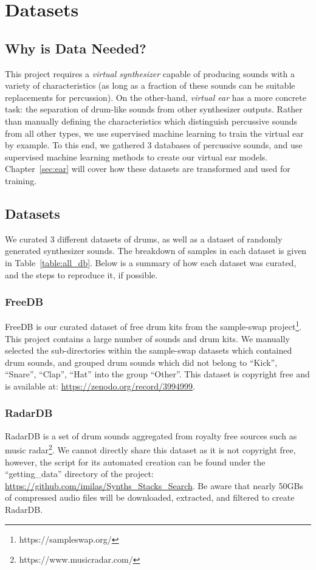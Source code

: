 \documentclass[\main/thesis.tex]{subfiles}
\begin{document}
\chapter{Datasets}
\label{sec:datasets}
\section{Why is Data Needed?}
This project requires a \textit{virtual synthesizer} capable of producing sounds with a variety of characteristics (as long as a fraction of these sounds can be suitable replacements for percussion). On the other-hand, \textit{virtual ear} has a more concrete task: the separation of drum-like sounds from other synthesizer outputs. Rather than manually defining the characteristics which distinguish percussive sounds from all other types, we use supervised machine learning to train the virtual ear by example. To this end, we gathered 3 databases of percussive sounds, and use supervised machine learning methods to create our virtual ear models. Chapter~\ref{sec:ear} will cover how these datasets are transformed and used for training.


\section{Datasets}
We curated 3 different datasets of drums, as well as a dataset of randomly generated synthesizer sounds.  The breakdown of samples in each dataset is given in Table~\ref{table:all_db}. Below is a summary of how each dataset was curated, and the steps to reproduce it, if possible. 
\subsection{FreeDB}
FreeDB is our curated dataset of free drum kits from the sample-swap project\footnote{https://sampleswap.org/}. This project contains  a large number of sounds and drum kits. We manually selected the sub-directories within the sample-swap datasets which contained drum sounds, and grouped drum sounds which did not belong to \enquote{Kick}, \enquote{Snare}, \enquote{Clap}, \enquote{Hat} into the group \enquote{Other}. This dataset is copyright free and is available at: \url{https://zenodo.org/record/3994999}. 
\subsection{RadarDB}
RadarDB is a set of drum sounds aggregated from royalty free sources such as music radar\footnote{https://www.musicradar.com/}. We cannot directly share this dataset as it is not copyright free, however, the script for its automated creation can be found under the \enquote{getting\_data} directory of the project: \url{https://github.com/imilas/Synths_Stacks_Search}. Be aware that nearly 50GBs of compressed audio files will be downloaded, extracted, and filtered to create RadarDB. 
\end{document}
